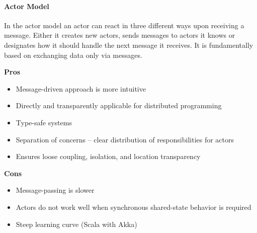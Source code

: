 \paragraph{Actor Model}
In the actor model an actor can react in three different ways upon receiving a message.
Either it creates new actors, sends messages to actors it knows or designates how it should handle the next message it receives.
It is fundamentally based on exchanging data only via messages.\\
\begin{minipage}[t]{0.49\textwidth}
  \textbf{Pros}
  \begin{itemize}[topsep=0pt,noitemsep]
    \item Message-driven approach is more intuitive
    \item Directly and transparently applicable for distributed programming
    \item Type-safe systems
    \item Separation of concerns – clear distribution of responsibilities for actors
    \item Ensures loose coupling, isolation, and location transparency
  \end{itemize}
\end{minipage}
\begin{minipage}[t]{0.49\textwidth}
  \textbf{Cons}
  \begin{itemize}[topsep=0pt, noitemsep]
    \item Message-passing is slower
    \item Actors do not work well when synchronous shared-state behavior is required
    \item Steep learning curve (Scala with Akka)
  \end{itemize}
\end{minipage}
\vspace{20pt}

